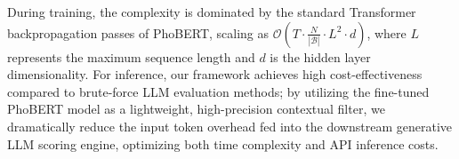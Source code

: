 \documentclass{article}
\newcommand{\method}{\textsc{MethodName}}
\theoremstyle{plain}
\theoremstyle{definition}
\theoremstyle{remark}
\begin{document}
During training, the complexity is dominated by the standard Transformer backpropagation passes of PhoBERT, scaling as $\mathcal{O}(T \cdot \frac{N}{|\mathcal{B}|} \cdot L^2 \cdot d)$, where $L$ represents the maximum sequence length and $d$ is the hidden layer dimensionality. For inference, our framework achieves high cost-effectiveness compared to brute-force LLM evaluation methods; by utilizing the fine-tuned PhoBERT model as a lightweight, high-precision contextual filter, we dramatically reduce the input token overhead fed into the downstream generative LLM scoring engine, optimizing both time complexity and API inference costs.






\end{document}
